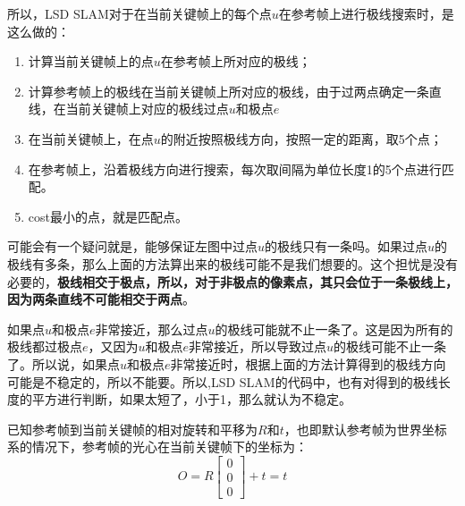 所以，LSD SLAM对于在当前关键帧上的每个点$u$在参考帧上进行极线搜索时，是这么做的：

\begin{enumerate}
	\item 计算当前关键帧上的点$u$在参考帧上所对应的极线；
	\item 计算参考帧上的极线在当前关键帧上所对应的极线，由于过两点确定一条直线，在当前关键帧上对应的极线过点$u$和极点$e$
	\item 在当前关键帧上，在点$u$的附近按照极线方向，按照一定的距离，取5个点；
	\item  在参考帧上，沿着极线方向进行搜索，每次取间隔为单位长度1的5个点进行匹配。
	\item cost最小的点，就是匹配点。
\end{enumerate}


可能会有一个疑问就是，能够保证左图中过点$u$的极线只有一条吗。如果过点$u$的极线有多条，那么上面的方法算出来的极线可能不是我们想要的。这个担忧是没有必要的，\textbf{极线相交于极点，所以，对于非极点的像素点，其只会位于一条极线上，因为两条直线不可能相交于两点}。

\begin{note}
	如果点$u$和极点$e$非常接近，那么过点$u$的极线可能就不止一条了。这是因为所有的极线都过极点$e$，又因为$u$和极点$e$非常接近，所以导致过点$u$的极线可能不止一条了。所以说，如果点$u$和极点$e$非常接近时，根据上面的方法计算得到的极线方向可能是不稳定的，所以不能要。所以,LSD SLAM的代码中，也有对得到的极线长度的平方进行判断，如果太短了，小于1，那么就认为不稳定。
\end{note}



已知参考帧到当前关键帧的相对旋转和平移为$R$和$t$，也即默认参考帧为世界坐标系的情况下，参考帧的光心在当前关键帧下的坐标为：
\begin{equation}
	O = R \left[\begin{array}{c}
		0 \\
		0 \\
		0
	\end{array}\right] + t = t
\end{equation}


